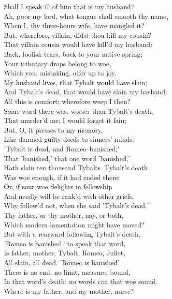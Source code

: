 \begin{speech}
Shall I speak ill of him that is my husband? \\
Ah, poor my lord, what tongue shall smooth thy name, \\
When I, thy three-hours wife, have mangled it? \\
But, wherefore, villain, didst thou kill my cousin? \\
That villain cousin would have kill'd my husband: \\
Back, foolish tears, back to your native spring; \\
Your tributary drops belong to woe, \\
Which you, mistaking, offer up to joy. \\
My husband lives, that Tybalt would have slain; \\
And Tybalt's dead, that would have slain my husband: \\
All this is comfort; wherefore weep I then? \\
Some word there was, worser than Tybalt's death, \\
That murder'd me: I would forget it fain; \\
But, O, it presses to my memory, \\
Like damned guilty deeds to sinners' minds: \\
'Tybalt is dead, and Romeo--banished;' \\
That 'banished,' that one word 'banished,' \\
Hath slain ten thousand Tybalts. Tybalt's death \\
Was woe enough, if it had ended there: \\
Or, if sour woe delights in fellowship \\
And needly will be rank'd with other griefs, \\
Why follow'd not, when she said 'Tybalt's dead,' \\
Thy father, or thy mother, nay, or both, \\
Which modern lamentation might have moved? \\
But with a rearward following Tybalt's death, \\
'Romeo is banished,' to speak that word, \\
Is father, mother, Tybalt, Romeo, Juliet, \\
All slain, all dead. 'Romeo is banished' \\
There is no end. no limit, measure, bound, \\
In that word's death; no words can that woe sound. \\
Where is my father, and my mother, nurse? \\
\end{speech}
